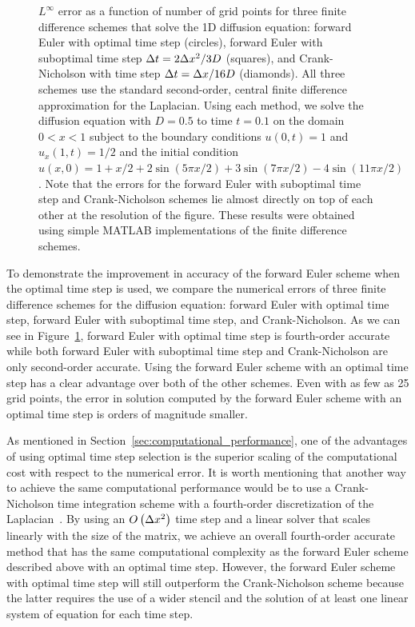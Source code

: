\documentclass[oneeqnum,onefignum,onetabnum,onethmnum]{siamltex}
\begin{document}
\begin{figure}[tb]
\begin{center}
\caption{$L^\infty$ error as a function of number of grid points for three 
finite difference schemes that solve the 1D diffusion equation: forward Euler 
with optimal time step (circles), forward Euler with suboptimal time step
$\Delta t = 2\Delta x^2/3D$ (squares), and Crank-Nicholson with time step 
$\Delta t = \Delta x/16 D$ (diamonds).  All three schemes use the standard second-order, 
central finite difference approximation for the Laplacian.  Using each method, 
we solve the diffusion equation with $D = 0.5$ to time $t = 0.1$ on the 
domain $0 < x < 1$ subject to the boundary conditions $u(0,t) = 1$ and 
$u_x(1,t) = 1/2$ and the initial condition
$u(x,0) = 1 + x/2 + 2 \sin(5 \pi x/2) + 3 \sin(7 \pi x/2) 
- 4 \sin(11 \pi x/2)$.  
Note that the errors for the forward Euler with suboptimal time 
step and Crank-Nicholson schemes lie almost directly on top of each other
at the resolution of the figure.
These results were obtained using simple MATLAB implementations of the 
finite difference schemes.
}
\label{fig:diffusion_eqn_1d_no_src_error}
\end{center}
\end{figure}

To demonstrate the improvement in accuracy of the forward Euler scheme when 
the optimal time step is used, we compare the numerical errors of three finite 
difference schemes for the diffusion equation: forward Euler with optimal
time step, forward Euler with suboptimal time step, and Crank-Nicholson.  
As we can see in Figure~\ref{fig:diffusion_eqn_1d_no_src_error}, forward 
Euler with optimal time step is fourth-order accurate while both forward Euler 
with suboptimal time step and Crank-Nicholson are only second-order accurate.  
Using the forward Euler scheme with an optimal time step has a clear 
advantage over both of the other schemes.  Even with as few as 25 grid 
points, the error in solution computed by the forward Euler scheme with an 
optimal time step is orders of magnitude smaller. 

As mentioned in Section~\ref{sec:computational_performance}, one of the 
advantages of using optimal time step selection is the superior scaling of 
the computational cost with respect to the numerical error.  It is worth 
mentioning that another way to achieve the same computational performance
would be to use a Crank-Nicholson time integration scheme with a fourth-order 
discretization of the Laplacian~\cite{gibou_2005}.  By using an 
$O\left(\Delta x^2 \right)$ time step and a linear solver that scales linearly 
with the size of the matrix, we achieve an overall fourth-order accurate 
method that has the same computational complexity as the forward Euler scheme
described above with an optimal time step.  However, the forward Euler scheme 
with optimal time step will still outperform the Crank-Nicholson scheme 
because the latter requires the use of a wider stencil and the solution of 
at least one linear system of equation for each time step. 
\end{document}
